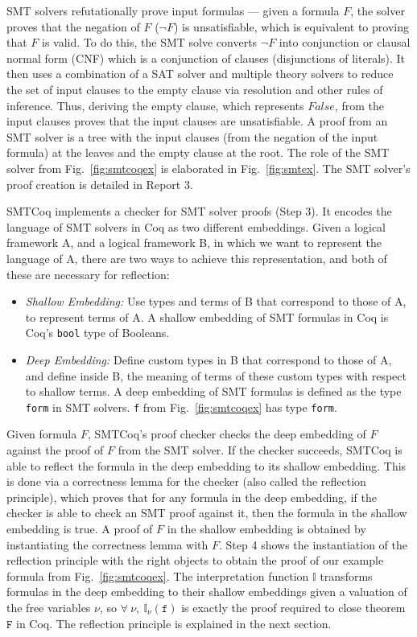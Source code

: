 \documentclass{article}
\begin{document}
	SMT solvers refutationally prove 
	input formulas --- given a formula
	$F$, the solver proves that the 
	negation of $F$ ($\neg F$) is 
	unsatisfiable, which is equivalent
	to proving that $F$ is valid. 
	To do this, the SMT solve converts 
	$\neg F$ into conjunction or clausal 
	normal form (CNF) which is a 
	conjunction of clauses (disjunctions 
	of literals). It then uses 
	a combination of a SAT solver and 
	multiple theory	solvers to reduce 
	the set of input clauses to the 
	empty clause via resolution
	and other rules of inference. Thus,
	deriving the empty clause, which 
	represents $False$, from the input 
	clauses proves that the input clauses 
	are unsatisfiable. A proof
	from an SMT solver is a tree 
	with the input clauses (from the 
	negation of the input formula) at
	the leaves and the empty clause
	at the root. The role of the SMT
	solver from Fig.~\ref{fig:smtcoqex}
	is elaborated in Fig.~\ref{fig:smtex}.
	The SMT solver's proof creation is 
	detailed in Report 3.
	
	SMTCoq implements a checker for 
	SMT solver proofs (Step 3). It 
	encodes the language of SMT solvers
	in Coq as two different embeddings. 
	Given a logical framework A, and 
	a logical framework B, in which we 
	want to represent the language of A, 
	there are two ways to achieve this
	representation, and 
	both of these are necessary for 
	reflection:
	\begin{itemize}
		\item \textit{Shallow Embedding: }
		Use types and terms of B that 
		correspond to those of A, to 
		represent terms of A. A shallow
		embedding of SMT formulas in 
		Coq is Coq's \texttt{bool} 
		type of Booleans.
		\item\textit{Deep Embedding: }
		Define custom types in B that 
		correspond to those of A, and 
		define inside B, the meaning of 
		terms of these custom types with 
		respect to shallow terms. A 
		deep embedding of SMT formulas 
		is defined as the type 
		\texttt{form} in SMT solvers.
		\texttt{f} from 
		Fig.~\ref{fig:smtcoqex} has
		type \texttt{form}.
	\end{itemize}

	Given formula $F$, SMTCoq's proof 
	checker checks the deep embedding of 
	$F$ against the proof of $F$ from the 
	SMT solver. If the checker succeeds, 
	SMTCoq is able to reflect the formula in 
	the deep embedding to its shallow 
	embedding. This is done via a 
	correctness lemma for the checker
	(also called the reflection principle),
	which proves that for any 
	formula in the deep embedding, if 
	the checker is able to check an SMT
	proof against it, then the formula in 
	the shallow embedding is true. A 
	proof of $F$ in the shallow 
	embedding is obtained by instantiating 
	the correctness lemma with $F$.
	Step 4 shows the instantiation of 
	the reflection principle with 
	the right objects to obtain the 
	proof of our example formula 
	from Fig.~\ref{fig:smtcoqex}. 
	The interpretation function
	$\mathbb{I}$ transforms 
	formulas in the deep embedding
	to their shallow embeddings
	given a valuation of the free 
	variables $\nu$, so 
	$\forall\ \nu,\ 
	\mathbb{I}_{\nu}(\texttt{f})$
	is exactly the proof required 
	to close theorem $\texttt{F}$
	in Coq. The reflection principle 
	is explained in the next section.	
	
\end{document}
